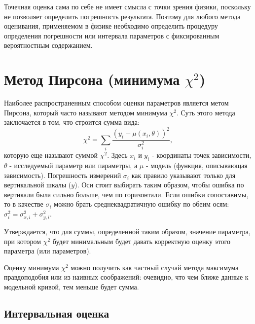 Точечная оценка сама по себе не имеет смысла с точки зрения физики, поскольку не позволяет определить погрешность результата. Поэтому для любого метода оценивания, применяемом в физике необходимо определить процедуру определения погрешности или интервала параметров с фиксированным вероятностным содержанием.

\section{Метод Пирсона (минимума \texorpdfstring{$\chi^{2}$}{chi2})}
\label{sec:chi2}

Наиболее распространенным способом оценки параметров является метом Пирсона, который часто называют методом минимума $\chi^2$. Суть этого метода заключается в том, что строится сумма вида:
\begin{equation}
    \chi^2 = \sum_i{\frac{(y_i - \mu(x_i,\theta))^2}{\sigma_i^2}},
\end{equation}
которую еще называют суммой $\chi^2$. Здесь $x_i$ и $y_i$ - координаты точек зависимости, $\theta$ - исследуемый параметр или параметры, а $\mu$ - модель (функция, описывающая зависимость). Погрешность измерений $\sigma_i$ как правило указывают только для вертикальной шкалы ($y$). Оси стоит выбирать таким образом, чтобы ошибка по вертикали была сильно больше, чем по горизонтали. Если ошибки сопоставимы, то в качестве $\sigma_i$ можно брать среднеквадратичную ошибку по обеим осям: $\sigma_i^2 = \sigma_{x,i}^2 + \sigma_{y,i}^2$. 

Утверждается, что для суммы, определенной таким образом, значение параметра, при котором $\chi^2$ будет минимальным будет давать корректную оценку этого параметра (или параметров).

Оценку минимума $\chi^2$ можно получить как частный случай метода максимума правдоподобия или из наивных соображений: очевидно, что чем ближе данные к модельной кривой, тем меньше будет сумма.


\subsection{Интервальная оценка}

